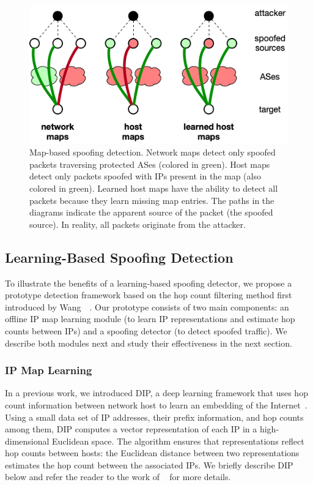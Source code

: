 \begin{figure}
	\centering
	\includegraphics[width=.7\linewidth]{Graph/spoof/learnedmaps.png}
	\caption{Map-based spoofing detection. Network maps detect only spoofed packets traversing protected ASes (colored in green). Host maps detect only packets spoofed with IPs present in the map (also colored in green). Learned host maps have the ability to detect all packets because they learn missing map entries. The paths in the diagrams indicate the apparent source of the packet (the spoofed source). In reality, all packets originate from the attacker.}
	\label{fig:learnedmaps}
	\vspace{0.5cm}
\end{figure}

\subsection{Learning-Based Spoofing Detection}
\label{spoof:design}

To illustrate the benefits of a learning-based spoofing detector, we propose a prototype detection framework based on the hop count filtering method first introduced by Wang~\etal{}~\citep{hcf}.
Our prototype consists of two main components: an offline IP map learning module (to learn IP representations and estimate hop counts between IPs) and a spoofing detector (to detect spoofed traffic). We describe both modules next and study their effectiveness in the next section. 



\subsubsection{IP Map Learning}

In a previous work, we introduced DIP, a deep learning framework that uses hop count information between network host to learn an embedding of the Internet~\citep{dip}. Using a small data set of IP addresses, their prefix information, and hop counts among them, DIP computes a vector representation of each IP in a high-dimensional Euclidean space. The algorithm ensures that representations reflect hop counts between hosts: the Euclidean distance between two representations estimates the hop count between the associated IPs. We briefly describe DIP below and refer the reader to the work of ~\citet{dip, dip-ccr} for more details.



